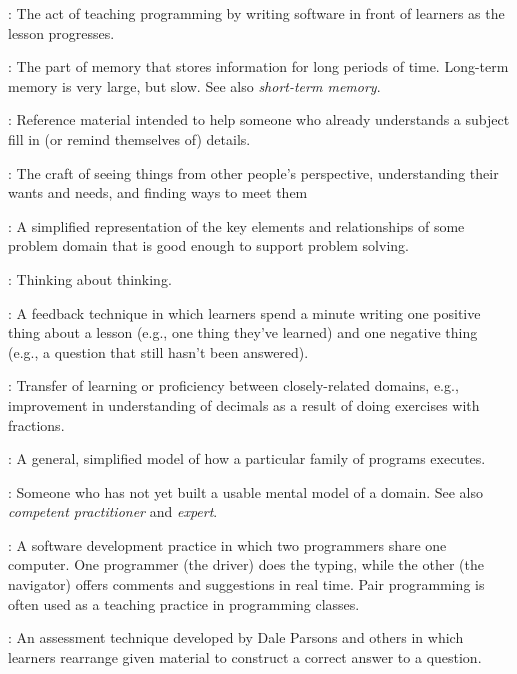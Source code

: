 \begin{description}
: The act of teaching programming
by writing software in front of learners as the lesson progresses.

: The part of memory
that stores information for long periods of time. Long-term memory is
very large, but slow. See also \emph{short-term memory}.

: Reference material intended to help someone
who already understands a subject fill in (or remind themselves of)
details.

: The craft of seeing things from
other people's perspective, understanding their wants and needs, and
finding ways to meet them

: A simplified representation
of the key elements and relationships of some problem domain that is
good enough to support problem solving.

: Thinking about thinking.

: A feedback technique in which
learners spend a minute writing one positive thing about a lesson (e.g.,
one thing they've learned) and one negative thing (e.g., a question that
still hasn't been answered).

: Transfer of learning or
proficiency between closely-related domains, e.g., improvement in
understanding of decimals as a result of doing exercises with fractions.

: A general, simplified
model of how a particular family of programs executes.

: Someone who has not yet built a usable
mental model of a domain. See also \emph{competent practitioner} and
\emph{expert}.

: A software
development practice in which two programmers share one computer. One
programmer (the driver) does the typing, while the other (the navigator)
offers comments and suggestions in real time. Pair programming is often
used as a teaching practice in programming classes.

: An assessment technique
developed by Dale Parsons and others in which learners rearrange given
material to construct a correct answer to a question.


\end{description}
